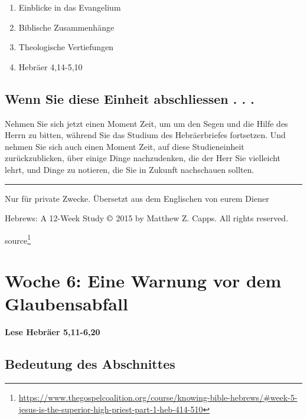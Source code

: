 \documentclass[
  12pt,
]{krantz}
\makeatletter
\providecommand{\tightlist}{%
  \setlength{\itemsep}{0pt}\setlength{\parskip}{0pt}}
\newenvironment{kframe}{%
\medskip{}
\setlength{\fboxsep}{.8em}
 \def\at@end@of@kframe{}%
 \ifinner\ifhmode%
  \def\at@end@of@kframe{\end{minipage}}%
  \begin{minipage}{\columnwidth}%
 \fi\fi%
 \def\FrameCommand##1{\hskip\@totalleftmargin \hskip-\fboxsep
 \colorbox{shadecolor}{##1}\hskip-\fboxsep
     \hskip-\linewidth \hskip-\@totalleftmargin \hskip\columnwidth}%
 \MakeFramed {\advance\hsize-\width
   \@totalleftmargin\z@ \linewidth\hsize
   \@setminipage}}%
 {\par\unskip\endMakeFramed%
 \at@end@of@kframe}
\newenvironment{rmdblock}[1]
  {
  \begin{itemize}
  \renewcommand{\labelitemi}{
    \raisebox{-.7\height}[0pt][0pt]{
      {\setkeys{Gin}{width=3em,keepaspectratio}\texttt{[image: img/\#1]}}
    }
  }
  \setlength{\fboxsep}{1em}
  \begin{kframe}
  \item
  }
  {
  \end{kframe}
  \end{itemize}
  }
\newenvironment{rmdbible}
  {\begin{rmdblock}{bible}}
  {\end{rmdblock}}
\renewcommand{\href}[2]{#2\footnote{\url{#1}}}
\makeatother
\begin{document}
\begin{enumerate}
\def\labelenumi{\arabic{enumi}.}
\tightlist
\item
  Einblicke in das Evangelium
\item
  Biblische Zusammenhänge
\item
  Theologische Vertiefungen
\item
  Hebräer 4,14-5,10
\end{enumerate}

\hypertarget{wenn-sie-diese-einheit-abschliessen-.-.-.}{%
\section{Wenn Sie diese Einheit abschliessen . . .}\label{wenn-sie-diese-einheit-abschliessen-.-.-.}}

Nehmen Sie sich jetzt einen Moment Zeit, um um den Segen und die Hilfe des Herrn zu bitten, während Sie das Studium des Hebräerbriefes fortsetzen. Und nehmen Sie sich auch einen Moment Zeit, auf diese Studieneinheit zurückzublicken, über einige Dinge nachzudenken, die der Herr Sie vielleicht lehrt, und Dinge zu notieren, die Sie in Zukunft nachschauen sollten.

\begin{center}\rule{0.5\linewidth}{0.5pt}\end{center}

Nur für private Zwecke. Übersetzt aus dem Englischen von eurem Diener

Hebrews: A 12-Week Study \(\copyright\) 2015 by Matthew Z. Capps. All rights reserved.

\href{https://www.thegospelcoalition.org/course/knowing-bible-hebrews/\#week-5-jesus-is-the-superior-high-priest-part-1-heb-414-510}{source}

\hypertarget{woche06}{%
\chapter{Woche 6: Eine Warnung vor dem Glaubensabfall}\label{woche06}}

\begin{rmdbible}
\textbf{Lese Hebräer 5,11-6,20}
\end{rmdbible}

\hypertarget{bedeutung-des-abschnittes}{%
\section{Bedeutung des Abschnittes}\label{bedeutung-des-abschnittes}}
\end{document}
